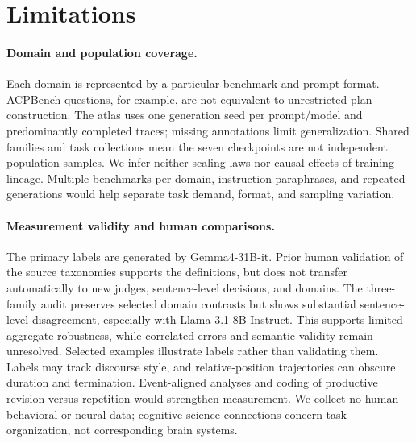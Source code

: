 \section*{Limitations}
\paragraph{Domain and population coverage.}
Each domain is represented by a particular benchmark and prompt format. ACPBench questions, for example, are not equivalent to unrestricted plan construction. The atlas uses one generation seed per prompt/model and predominantly completed traces; missing annotations limit generalization. Shared families and task collections mean the seven checkpoints are not independent population samples. We infer neither scaling laws nor causal effects of training lineage. Multiple benchmarks per domain, instruction paraphrases, and repeated generations would help separate task demand, format, and sampling variation.

\paragraph{Measurement validity and human comparisons.}
The primary labels are generated by Gemma4-31B-it. Prior human validation of the source taxonomies supports the definitions, but does not transfer automatically to new judges, sentence-level decisions, and domains. The three-family audit preserves selected domain contrasts but shows substantial sentence-level disagreement, especially with Llama-3.1-8B-Instruct. This supports limited aggregate robustness, while correlated errors and semantic validity remain unresolved. Selected examples illustrate labels rather than validating them. Labels may track discourse style, and relative-position trajectories can obscure duration and termination. Event-aligned analyses and coding of productive revision versus repetition would strengthen measurement. We collect no human behavioral or neural data; cognitive-science connections concern task organization, not corresponding brain systems.

